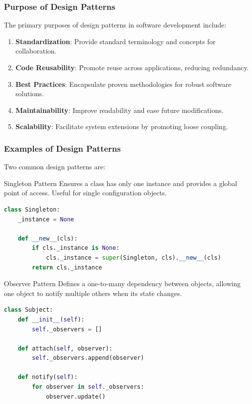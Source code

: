 \documentclass{beamer}
\begin{document}
\begin{frame}[fragile]
    \frametitle{Purpose of Design Patterns}
    The primary purposes of design patterns in software development include:
    \begin{enumerate}
        \item \textbf{Standardization}: Provide standard terminology and concepts for collaboration.
        \item \textbf{Code Reusability}: Promote reuse across applications, reducing redundancy.
        \item \textbf{Best Practices}: Encapsulate proven methodologies for robust software solutions.
        \item \textbf{Maintainability}: Improve readability and ease future modifications.
        \item \textbf{Scalability}: Facilitate system extensions by promoting loose coupling.
    \end{enumerate}
\end{frame}

\begin{frame}[fragile]
    \frametitle{Examples of Design Patterns}
    Two common design patterns are:
    
    \begin{block}{Singleton Pattern}
        Ensures a class has only one instance and provides a global point of access. Useful for single configuration objects.
        \begin{lstlisting}[language=Python]
class Singleton:
    _instance = None

    def __new__(cls):
        if cls._instance is None:
            cls._instance = super(Singleton, cls).__new__(cls)
        return cls._instance
        \end{lstlisting}
    \end{block}

    \begin{block}{Observer Pattern}
        Defines a one-to-many dependency between objects, allowing one object to notify multiple others when its state changes.
        \begin{lstlisting}[language=Python]
class Subject:
    def __init__(self):
        self._observers = []

    def attach(self, observer):
        self._observers.append(observer)

    def notify(self):
        for observer in self._observers:
            observer.update()
        \end{lstlisting}
    \end{block}
\end{frame}
\end{document}
